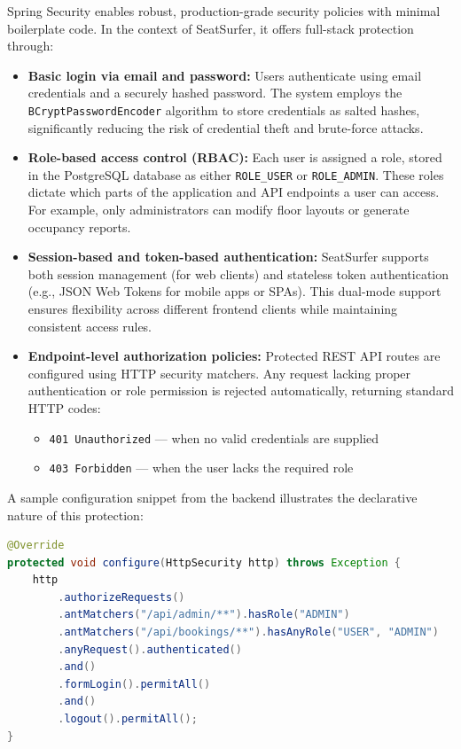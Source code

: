 \documentclass[12pt,a4paper]{report} %
\begin{document}
Spring Security enables robust, production-grade security policies with minimal boilerplate code. In the context of SeatSurfer, it offers full-stack protection through:

\begin{itemize}
    \item \textbf{Basic login via email and password:} Users authenticate using email credentials and a securely hashed password. The system employs the \texttt{BCryptPasswordEncoder} algorithm to store credentials as salted hashes, significantly reducing the risk of credential theft and brute-force attacks.

    \item \textbf{Role-based access control (RBAC):} Each user is assigned a role, stored in the PostgreSQL database as either \verb|ROLE_USER| or \verb|ROLE_ADMIN|. These roles dictate which parts of the application and API endpoints a user can access. For example, only administrators can modify floor layouts or generate occupancy reports.

    \item \textbf{Session-based and token-based authentication:} SeatSurfer supports both session management (for web clients) and stateless token authentication (e.g., JSON Web Tokens for mobile apps or SPAs). This dual-mode support ensures flexibility across different frontend clients while maintaining consistent access rules.

    \item \textbf{Endpoint-level authorization policies:} Protected REST API routes are configured using HTTP security matchers. Any request lacking proper authentication or role permission is rejected automatically, returning standard HTTP codes:
    \begin{itemize}
        \item \texttt{401 Unauthorized} — when no valid credentials are supplied
        \item \texttt{403 Forbidden} — when the user lacks the required role
    \end{itemize}
\end{itemize}

\noindent
A sample configuration snippet from the backend illustrates the declarative nature of this protection:

\begin{lstlisting}[language=Java, caption=Spring Security Configuration Snippet]
@Override
protected void configure(HttpSecurity http) throws Exception {
    http
        .authorizeRequests()
        .antMatchers("/api/admin/**").hasRole("ADMIN")
        .antMatchers("/api/bookings/**").hasAnyRole("USER", "ADMIN")
        .anyRequest().authenticated()
        .and()
        .formLogin().permitAll()
        .and()
        .logout().permitAll();
}
\end{lstlisting}
\end{document}
